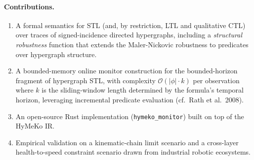 \documentclass[runningheads]{llncs}
\begin{document}


\paragraph{Contributions.}
\begin{enumerate}
  \item A formal semantics for STL (and, by restriction, LTL
        and qualitative CTL) over traces of signed-incidence
        directed hypergraphs, including a \emph{structural
        robustness} function that extends the Maler-Nickovic
        robustness to predicates over hypergraph structure.
  \item A bounded-memory online monitor construction for the
        bounded-horizon fragment of hypergraph STL, with
        complexity $\mathcal{O}(|\phi| \cdot k)$ per observation
        where $k$ is the sliding-window length determined by
        the formula's temporal horizon, leveraging incremental
        predicate evaluation (cf.\ Rath et al.\ 2008).
  \item An open-source Rust implementation (\texttt{hymeko\_monitor})
        built on top of the HyMeKo IR.
  \item Empirical validation on a kinematic-chain limit
        scenario and a cross-layer health-to-speed constraint
        scenario drawn from industrial robotic ecosystems.
\end{enumerate}
\end{document}
